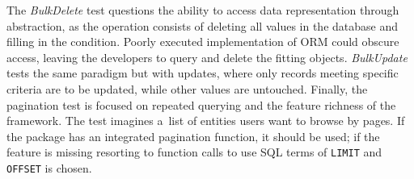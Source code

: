 The \textit{BulkDelete} test questions the ability to access data representation
through abstraction, as the operation consists of deleting all values in the
database and filling in the condition. Poorly executed implementation of ORM
could obscure access, leaving the developers to query and delete the fitting
objects. \textit{BulkUpdate} tests the same paradigm but with updates, where
only records meeting specific criteria are to be updated, while other values are
untouched. Finally, the pagination test is focused on repeated querying and the
feature richness of the framework. The test imagines a~list of entities users
want to browse by pages. If the package has an integrated pagination function,
it should be used; if the feature is missing resorting to function calls to use
SQL terms of \texttt{LIMIT} and \texttt{OFFSET} is chosen.
